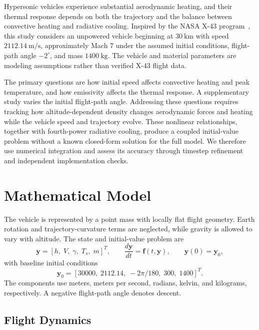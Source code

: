\documentclass[conf]{new-aiaa}
\begin{document}
Hypersonic vehicles experience substantial aerodynamic heating, and their
thermal response depends on both the trajectory and the balance between
convective heating and radiative cooling. Inspired by the NASA X-43 program~\cite{nasa-x43}, this
study considers an unpowered vehicle beginning at $30~\mathrm{km}$ with
speed $2112.14~\mathrm{m/s}$, approximately Mach 7 under the assumed initial
conditions, flight-path angle $-2^\circ$, and mass $1400~\mathrm{kg}$.
The vehicle and material parameters are modeling assumptions rather than
verified X-43 flight data.

The primary questions are how initial speed affects convective heating and
peak temperature, and how emissivity affects the thermal response. A
supplementary study varies the initial flight-path angle. Addressing these
questions requires tracking how altitude-dependent density changes aerodynamic
forces and heating while the vehicle speed and trajectory evolve. These
nonlinear relationships, together with fourth-power radiative cooling,
produce a coupled initial-value problem without a known closed-form solution
for the full model. We therefore use numerical integration and assess its
accuracy through timestep refinement and independent implementation checks.

\section{Mathematical Model}

The vehicle is represented by a point mass with locally flat flight geometry.
Earth rotation and trajectory-curvature terms are neglected, while gravity
is allowed to vary with altitude. The state and initial-value problem are
\begin{equation}
\mathbf y=[h,\;V,\;\gamma,\;T_s,\;m]^T,
\qquad
\frac{d\mathbf y}{dt}=\mathbf f(t,\mathbf y),
\qquad
\mathbf y(0)=\mathbf y_0,
\end{equation}
with baseline initial conditions
\begin{equation}
\mathbf y_0=[30000,\;2112.14,\;-2\pi/180,\;300,\;1400]^T.
\end{equation}
The components use meters, meters per second, radians, kelvin, and kilograms,
respectively. A negative flight-path angle denotes descent.

\subsection{Flight Dynamics}
\end{document}
